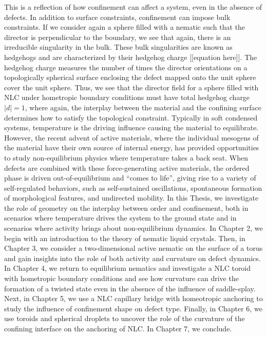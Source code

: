 This is a reflection of how confinement can affect a system, even in the absence of defects.
In addition to surface constraints, confinement can impose bulk constraints.
If we consider again a sphere filled with a nematic such that the director is perpendicular to the boundary, we see that again, there is an irreducible singularity in the bulk.
These bulk singularities are known as hedgehogs and are characterized by their hedgehog charge [[equation here]].
The hedgehog charge measures the number of times the director orientations on a topologically spherical surface enclosing the defect mapped onto the unit sphere cover the unit sphere.
Thus, we see that the director field for a sphere filled with NLC under hometropic boundary conditions must have total hedgehog charge $|d| = 1$, where again, the interplay between the material and the confining surface determines how to satisfy the topological constraint.
Typically in soft condensed systems, temperature is the driving influence causing the material to equilibrate.
However, the recent advent of active materials, where the individual mesogens of the material have their own source of internal energy, has provided opportunities to study non-equilibrium physics where temperature takes a back seat.
When defects are combined with these force-generating active materials, the ordered phase is driven out-of-equilibrium and ``comes to life'', giving rise to a variety of self-regulated behaviors, such as self-sustained oscillations, spontaneous formation of morphological features, and undirected mobility.
In this Thesis, we investigate the role of geometry on the interplay between order and confinement, both in scenarios where temperature drives the system to the ground state and in scenarios where activity brings about non-equilibrium dynamics.
In Chapter 2, we begin with an introduction to the theory of nematic liquid crystals.
Then, in Chapter 3, we consider a two-dimensional active nematic on the surface of a torus and gain insights into the role of both activity and curvature on defect dynamics.
In Chapter 4, we return to equilibrium nematics and investigate a NLC toroid with hometropic boundary conditions and see how curvature can drive the formation of a twisted state even in the absence of the influence of saddle-splay.
Next, in Chapter 5, we use a NLC capillary bridge with homeotropic anchoring to study the influence of confinement shape on defect type.
Finally, in Chapter 6, we use toroids and spherical droplets to uncover the role of the curvature of the confining interface on the anchoring of NLC.
In Chapter 7, we conclude.
